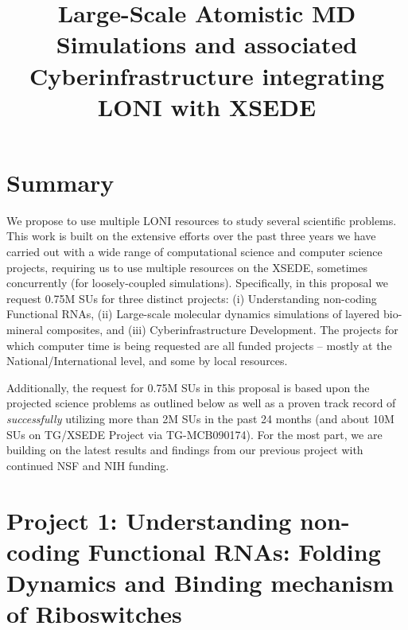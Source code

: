 \documentclass[a4paper,11pt]{article}
\begin{document}
\title{\Large Large-Scale Atomistic MD Simulations and associated
  Cyberinfrastructure integrating LONI with XSEDE}

\date{}

\maketitle
 
\section{Summary}
We propose to use multiple LONI resources to study several scientific problems. This work is built on the extensive efforts over the past three years we have carried out with a wide range of computational science and computer science projects, requiring us to use multiple resources on the XSEDE, sometimes concurrently (for loosely-coupled simulations).  Specifically, in this proposal we request 0.75M SUs for three distinct projects: (i) Understanding non-coding Functional RNAs, (ii) Large-scale molecular dynamics simulations of layered bio-mineral composites, and (iii) Cyberinfrastructure Development. The projects for which computer time is being requested are all funded projects -- mostly at the National/International level, and some by local resources.

Additionally, the request for 0.75M SUs in this proposal is based upon the projected science problems as outlined below as well as a proven track record of {\it successfully} utilizing more than 2M SUs in the past 24 months (and about 10M SUs on TG/XSEDE Project via TG-MCB090174). For the most part, we are building on the latest results and findings from our previous project with continued NSF and NIH funding.


\section{Project 1: Understanding non-coding Functional RNAs: 
Folding Dynamics and Binding mechanism of Riboswitches}
\end{document}
